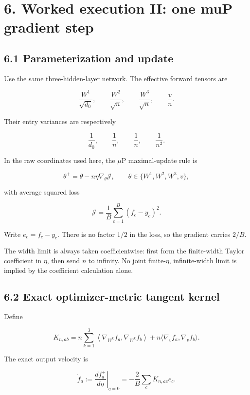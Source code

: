 \section*{6. Worked execution II: one muP gradient step}


\subsection*{6.1 Parameterization and update}


Use the same three-hidden-layer network. The effective forward tensors are

\[
\frac{W^1}{\sqrt{d_0}},
\qquad
\frac{W^2}{\sqrt n},
\qquad
\frac{W^3}{\sqrt n},
\qquad
\frac vn.
\]


Their entry variances are respectively

\[
\frac1{d_0},\qquad \frac1n,\qquad \frac1n,\qquad\frac1{n^2}.
\]


In the raw coordinates used here, the \(\mu\)P maximal-update rule is

\[
\theta^+
=
\theta-n\eta\nabla_\theta\mathcal J,
\qquad
\theta\in\{W^1,W^2,W^3,v\},
\]


with average squared loss

\[
\mathcal J
=
\frac1B\sum_{c=1}^B(f_c-y_c)^2.
\]


Write \(e_c=f_c-y_c\). There is no factor \(1/2\) in the loss, so the
gradient carries \(2/B\).

The width limit is always taken coefficientwise: first form the finite-width
Taylor coefficient in \(\eta\), then send \(n\) to infinity. No joint
finite-\(\eta\), infinite-width limit is implied by the coefficient
calculation alone.

\subsection*{6.2 Exact optimizer-metric tangent kernel}


Define

\[
K_{n,ab}
=
n\sum_{k=1}^3
\left\langle
\nabla_{W^k}f_a,\nabla_{W^k}f_b
\right\rangle
+n\langle\nabla_vf_a,\nabla_vf_b\rangle.
\]


The exact output velocity is

\[
\dot f_a
:=
\left.\frac{df_a^+}{d\eta}\right|_{\eta=0}
=
-\frac2B\sum_cK_{n,ac}e_c.
\]



